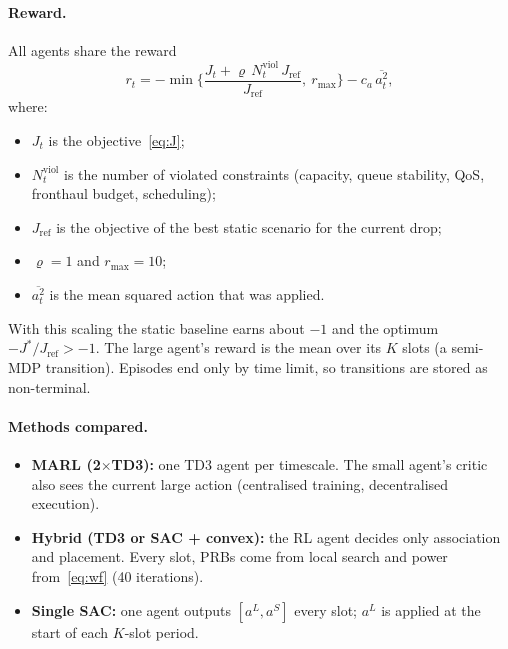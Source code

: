 \documentclass[11pt,oneside]{report}
\begin{document}
\paragraph{Reward.}
All agents share the reward
\begin{equation}\label{eq:reward}
	r_t=-\min\Big\{\frac{J_t+\varrho\,N^{\text{viol}}_t\,J_{\text{ref}}}{J_{\text{ref}}},\ r_{\max}\Big\}-c_a\,\overline{a_t^{2}},
\end{equation}
where:
\begin{itemize}
	\item $J_t$ is the objective~\eqref{eq:J};
	\item $N^{\text{viol}}_t$ is the number of violated constraints (capacity, queue stability, QoS, fronthaul budget, scheduling);
	\item $J_{\text{ref}}$ is the objective of the best static scenario for the current drop;
	\item $\varrho=1$ and $r_{\max}=10$;
	\item $\overline{a_t^2}$ is the mean squared action that was applied.
\end{itemize}
With this scaling the static baseline earns about $-1$ and the optimum $-J^*/J_{\text{ref}}>-1$.
The large agent's reward is the mean over its $K$ slots (a semi-MDP transition).
Episodes end only by time limit, so transitions are stored as non-terminal.

\paragraph{Methods compared.}
\begin{itemize}
	\item \textbf{MARL (2$\times$TD3):} one TD3 agent per timescale. The small agent's critic also sees the current large action (centralised training, decentralised execution).
	\item \textbf{Hybrid (TD3 or SAC + convex):} the RL agent decides only association and placement. Every slot, PRBs come from local search and power from~\eqref{eq:wf} (40 iterations).
	\item \textbf{Single SAC:} one agent outputs $[a^L,a^S]$ every slot; $a^L$ is applied at the start of each $K$-slot period.
\end{itemize}
\end{document}
